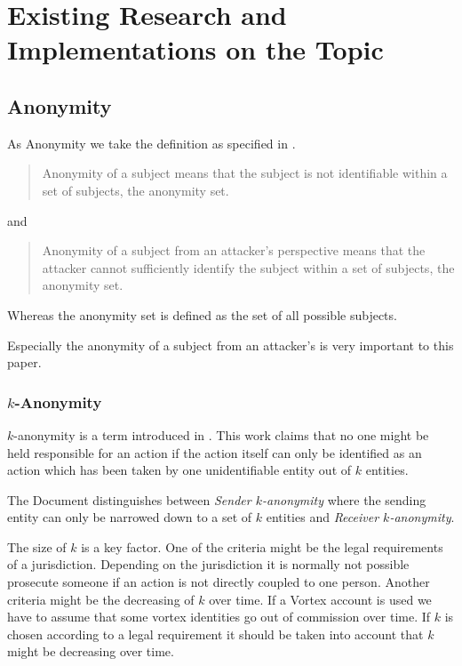 

\chapter{Existing Research and Implementations on the Topic \label{sec:existingRD}}
\section{Anonymity}
As Anonymity we take the definition as specified in \cite{anon_terminology}.
\begin{quote}
	Anonymity of a subject means that the subject is not identifiable within a set of subjects, the anonymity set.\omitted
\end{quote}
and
\begin{quote}
	Anonymity of a subject from an attacker's perspective means that the attacker cannot sufficiently identify the subject within a set of subjects, the anonymity set.\omitted
\end{quote}

Whereas the anonymity set is defined as the set of all possible subjects.

Especially the anonymity of a subject from an attacker's is very important to this paper. 

\subsection{$k$-Anonymity}
$k$-anonymity is a term introduced in \cite{k-anonymous:ccs2003}. This work claims that no one might be held responsible for an action if the action itself can only be identified as an action which has been taken by one unidentifiable entity out of $k$ entities.

The Document distinguishes between \textit{Sender $k$-anonymity} where the sending entity can only be narrowed down to a set of $k$ entities and \textit{Receiver $k$-anonymity}. 

The size of $k$ is a key factor. One of the criteria might be the legal requirements of a jurisdiction. Depending on the jurisdiction it is normally not possible prosecute someone if an action is not directly coupled to one person. Another criteria might be the decreasing of $k$ over time. If a Vortex account is used we have to assume that some vortex identities go out of commission over time. If $k$ is chosen according to a legal requirement it should be taken into account that $k$ might be decreasing over time.

